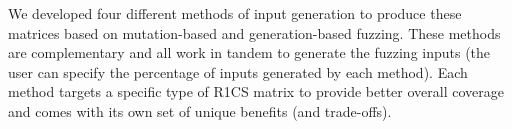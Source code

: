 
%
We developed four different methods of input generation to produce these matrices based on mutation-based and generation-based fuzzing.  These methods are complementary and all work in tandem to generate the fuzzing inputs (the user can specify the percentage of inputs generated by each method).  Each method targets a specific type of R1CS matrix to provide better overall coverage and comes with its own set of unique benefits (and trade-offs).


